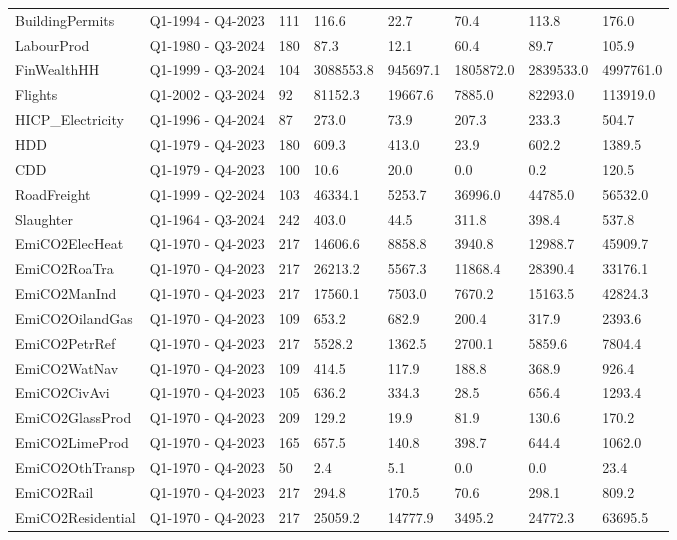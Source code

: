 \begin{longtable}[t]{llllllll}
\addlinespace
BuildingPermits & Q1-1994 - Q4-2023 & 111 & 116.6 & 22.7 & 70.4 & 113.8 & 176.0\\
LabourProd & Q1-1980 - Q3-2024 & 180 & 87.3 & 12.1 & 60.4 & 89.7 & 105.9\\
FinWealthHH & Q1-1999 - Q3-2024 & 104 & 3088553.8 & 945697.1 & 1805872.0 & 2839533.0 & 4997761.0\\
Flights & Q1-2002 - Q3-2024 & 92 & 81152.3 & 19667.6 & 7885.0 & 82293.0 & 113919.0\\
HICP\_Electricity & Q1-1996 - Q4-2024 & 87 & 273.0 & 73.9 & 207.3 & 233.3 & 504.7\\
\addlinespace
HDD & Q1-1979 - Q4-2023 & 180 & 609.3 & 413.0 & 23.9 & 602.2 & 1389.5\\
CDD & Q1-1979 - Q4-2023 & 100 & 10.6 & 20.0 & 0.0 & 0.2 & 120.5\\
RoadFreight & Q1-1999 - Q2-2024 & 103 & 46334.1 & 5253.7 & 36996.0 & 44785.0 & 56532.0\\
Slaughter & Q1-1964 - Q3-2024 & 242 & 403.0 & 44.5 & 311.8 & 398.4 & 537.8\\
EmiCO2ElecHeat & Q1-1970 - Q4-2023 & 217 & 14606.6 & 8858.8 & 3940.8 & 12988.7 & 45909.7\\
\addlinespace
EmiCO2RoaTra & Q1-1970 - Q4-2023 & 217 & 26213.2 & 5567.3 & 11868.4 & 28390.4 & 33176.1\\
EmiCO2ManInd & Q1-1970 - Q4-2023 & 217 & 17560.1 & 7503.0 & 7670.2 & 15163.5 & 42824.3\\
EmiCO2OilandGas & Q1-1970 - Q4-2023 & 109 & 653.2 & 682.9 & 200.4 & 317.9 & 2393.6\\
EmiCO2PetrRef & Q1-1970 - Q4-2023 & 217 & 5528.2 & 1362.5 & 2700.1 & 5859.6 & 7804.4\\
EmiCO2WatNav & Q1-1970 - Q4-2023 & 109 & 414.5 & 117.9 & 188.8 & 368.9 & 926.4\\
\addlinespace
EmiCO2CivAvi & Q1-1970 - Q4-2023 & 105 & 636.2 & 334.3 & 28.5 & 656.4 & 1293.4\\
EmiCO2GlassProd & Q1-1970 - Q4-2023 & 209 & 129.2 & 19.9 & 81.9 & 130.6 & 170.2\\
EmiCO2LimeProd & Q1-1970 - Q4-2023 & 165 & 657.5 & 140.8 & 398.7 & 644.4 & 1062.0\\
EmiCO2OthTransp & Q1-1970 - Q4-2023 & 50 & 2.4 & 5.1 & 0.0 & 0.0 & 23.4\\
EmiCO2Rail & Q1-1970 - Q4-2023 & 217 & 294.8 & 170.5 & 70.6 & 298.1 & 809.2\\
\addlinespace
EmiCO2Residential & Q1-1970 - Q4-2023 & 217 & 25059.2 & 14777.9 & 3495.2 & 24772.3 & 63695.5\\

\end{longtable}
